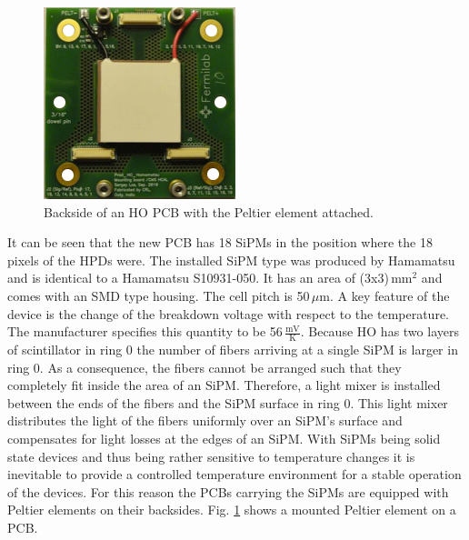 \begin{figure}[h]
\begin{minipage}[t]{0.435\textwidth}
\includegraphics[width=\textwidth]{Figures/kuensken/pcbPeltier.png}
\caption{Backside of an HO PCB with the Peltier element attached.}
\label{kuenskenpeltier}
\end{minipage}
\end{figure}
It can be seen that the new PCB has 18 SiPMs in the position where the 18 pixels of the HPDs were.
The installed SiPM type was produced by Hamamatsu and is identical to a Hamamatsu S10931-050. It has an area of (3x3)\,mm$^2$ and comes with an SMD type housing. The cell pitch is 50\,$\mu$m. A key feature of the device is the change of the breakdown voltage with respect to the temperature. The manufacturer specifies this quantity to be 56\,$\frac{\text{mV}}{\text{K}}$.
Because HO has two layers of scintillator in ring 0 the number of fibers arriving at a single SiPM is larger in ring 0. As a consequence, the fibers cannot be arranged such that they completely fit inside the area of an SiPM. Therefore, a light mixer is installed between the ends of the fibers and the SiPM surface in ring 0. This light mixer distributes the light of the fibers uniformly over an SiPM's surface and compensates for light losses at the edges of an SiPM.
With SiPMs being solid state devices and thus being rather sensitive to temperature changes it is inevitable to provide a controlled temperature environment for a stable operation of the devices. For this reason the PCBs carrying the SiPMs are equipped with Peltier elements on their backsides. Fig. \ref{kuenskenpeltier} shows a mounted Peltier element on a PCB.
